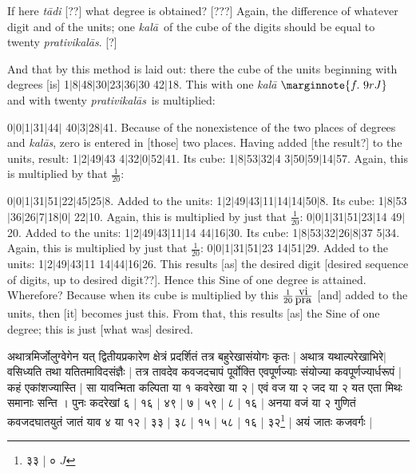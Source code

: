 \documentclass[12pt]{book}
\def\kala{\textit{ka\-l\=a}}
\def\kalas{\textit{ka\-l\=as}}
\def\prativikalas{\textit{prati\-vi\-ka\-l\=as}}
\def\danda{$|$}
\begin{document}
If here \textit{t\=adi} [??] what degree is obtained?  [???] 
Again, the difference of whatever digit and of the units; one \kala\ of the cube of the digits
should be equal to twenty \prativikalas. [?]

And that by this method is laid out: there the cube of the units beginning with degrees [is]
1\danda 8\danda 48\danda 30\danda 23\danda 36\danda 30 42\danda 18.
This with one \kala
$\marginnote{f.~9r J}$
and with twenty \prativikalas\ is multiplied: 

0\danda 0\danda 1\danda 31\danda 44\danda
40\danda 3\danda 28\danda 41.
Because of the nonexistence of the two places of degrees and \kalas, zero is entered in 
[those] two places. Having added [the result?] to the units, result:
1\danda 2\danda 49\danda 43 4\danda 32\danda 0\danda 52\danda 41. Its cube:
1\danda 8\danda 53\danda 32\danda 4 3\danda 50\danda 59\danda 14\danda 57.
Again, this  is multiplied by that $\frac{1}{20}$: 


0\danda 0\danda 1\danda 31\danda 51\danda 22\danda 45\danda 25\danda 8.
Added to the units:
1\danda 2\danda 49\danda 43\danda 11\danda 14\danda 14\danda 50\danda 8.
Its cube: 1\danda 8\danda 53\danda 36\danda 26\danda 7\danda 18\danda 0\danda
22\danda 10.
Again, this is multiplied by just that $\frac{1}{20}$: 
0\danda 0\danda 1\danda 31\danda 51\danda 23\danda 14 49\danda 20.
Added to the units: 1\danda 2\danda 49\danda 43\danda 11\danda 14 44\danda 16\danda 30.
Its cube: 1\danda 8\danda 53\danda 32\danda 26\danda 8\danda 37 5\danda 34.
Again, this is multiplied by just that $\frac{1}{20}$: 
0\danda 0\danda 1\danda 31\danda 51\danda 23 14\danda 51\danda 29. 
Added to the units: 1\danda 2\danda 49\danda 43\danda 11 14\danda 44\danda 16\danda 26.
This results [as] the desired digit [desired sequence of digits, up to desired digit??]. 
Hence this Sine of one degree is attained.  Wherefore?  Because when its cube 
is multiplied by this $\frac{1}{20} \frac{\hbox{vi}}{\hbox{pra}}$ [and] added to the units,
then [it] becomes just this. From that, this results [as] the Sine of one degree; this is just
[what was] desired. 

\newpage

{\s अथात्रमिर्जोलुग्वेगेन
यत् द्वितीयप्रकारेण क्षेत्रं प्रदर्शितं तत्र बहुरेखासंयोगः कृतः | अथात्र यथाल्परेखाभिरे$|$
वसिध्यति तथा यतितमाविदसंज्ञैः |
तत्र तावदेव कवजदचापं पूर्वोक्ति एवपूर्णज्याः
संयोज्या कवपूर्णज्यार्धरूपं | कहं एकांशज्यास्ति |
सा यावन्मिता कल्पिता या १ कवरेखा या २ | एवं वज या २ जद या २ यत एता मिथः
समानाः सन्ति । पुनः कदरेखां ६ | १६ | ४९ | ७ | ५९ | ८ | १६ | अनया वजं या २
गुणितं कवजदघातयुतं जातं याव ४ या १२ | ३३ | ३८ | १५ | ५८ | १६ | ३२\footnote{{\s ३३ | ०} $J$} | अयं
जातः कजवर्गः |} \\ 
\end{document}
